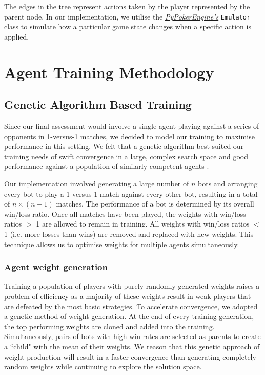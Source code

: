 \documentclass{article}
\begin{document}
The edges in the tree represent actions taken by the player represented by the parent node. In our implementation, we utilise the \hyperlink{pypokerengine}{\emph{PyPokerEngine's}} \texttt{Emulator} class to simulate how a particular game state changes when a specific action is applied.

\section{Agent Training Methodology}
\subsection{Genetic Algorithm Based Training}
Since our final assessment would involve a single agent playing against a series of opponents in 1-versus-1 matches, we decided to model our training to maximise performance in this setting. We felt that a genetic algorithm best suited our training needs of swift convergence in a large, complex search space and good performance against a population of similarly competent agents \cite{DeJong1988}.

Our implementation involved generating a large number of \(n\) bots and arranging every bot to play a 1-versus-1 match against every other bot, resulting in a total of \(n \times (n-1)\) matches. The performance of a bot is determined by its overall win/loss ratio. Once all matches have been played, the weights with win/loss ratios \(>\) 1 are allowed to remain in training. All weights with win/loss ratios \(<\) 1 (i.e. more losses than wins) are removed and replaced with new weights. This technique allows us to optimise weights for multiple agents simultaneously.

\subsubsection{Agent weight generation}
Training a population of players with purely randomly generated weights raises a problem of efficiency as a majority of these weights result in weak players that are defeated by the most basic strategies. To accelerate convergence, we adopted a genetic method of weight generation. At the end of every training generation, the top performing weights are cloned and added into the training. Simultaneously, pairs of bots with high win rates are selected as parents to create a ``child" with the mean of their weights. We reason that this genetic approach of weight production will result in a faster convergence than generating completely random weights while continuing to explore the solution space.
\end{document}
